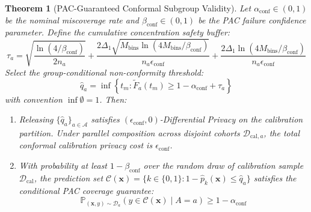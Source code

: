 \documentclass[3p,12pt]{elsarticle}
\theoremstyle{plain}
\newtheorem{theorem}{Theorem}
\theoremstyle{definition}
\begin{document}
\begin{theorem}[PAC-Guaranteed Conformal Subgroup Validity]
\label{thm:conformal}
Let $\alpha_{\text{conf}} \in (0, 1)$ be the nominal miscoverage rate and $\beta_{\text{conf}} \in (0, 1)$ be the PAC failure confidence parameter. Define the cumulative concentration safety buffer:
\begin{equation}
    \label{eq:tau_a}
    \tau_a = \sqrt{\frac{\ln(4/\beta_{\text{conf}})}{2 n_a}} + \frac{2 \Delta_1 \sqrt{M_{\text{bins}} \ln(4M_{\text{bins}}/\beta_{\text{conf}})}}{n_a \epsilon_{\text{conf}}} + \frac{2 \Delta_1 \ln(4M_{\text{bins}}/\beta_{\text{conf}})}{n_a \epsilon_{\text{conf}}}
\end{equation}
Select the group-conditional non-conformity threshold:
\begin{equation}
    \hat{q}_a = \inf \left\{ t_m : \widetilde{F}_a(t_m) \ge 1 - \alpha_{\text{conf}} + \tau_a \right\}
\end{equation}
with convention $\inf \emptyset = 1$. Then:
\begin{enumerate}
    \item Releasing $\{\hat{q}_a\}_{a \in \mathcal{A}}$ satisfies $(\epsilon_{\text{conf}}, 0)$-Differential Privacy on the calibration partition. Under parallel composition across disjoint cohorts $\mathcal{D}_{\text{cal}, a}$, the total conformal calibration privacy cost is $\epsilon_{\text{conf}}$.
    \item With probability at least $1 - \beta_{\text{conf}}$ over the random draw of calibration sample $\mathcal{D}_{\text{cal}}$, the prediction set $\mathcal{C}(\mathbf{x}) = \{k \in \{0, 1\} : 1 - \hat{p}_k(\mathbf{x}) \le \hat{q}_a\}$ satisfies the conditional PAC coverage guarantee:
    \begin{equation}
        \mathbb{P}_{(\mathbf{x}, y) \sim \mathcal{D}_a}\left( y \in \mathcal{C}(\mathbf{x}) \mid A = a \right) \ge 1 - \alpha_{\text{conf}}
    \end{equation}
\end{enumerate}
\end{theorem}
\end{document}
